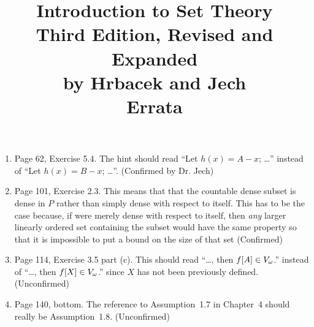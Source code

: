 \documentclass{report}
\title{
  Introduction to Set Theory \\
  Third Edition, Revised and Expanded \\
  by Hrbacek and Jech \\
  Errata
}
\begin{document}


\maketitle

\begin{enumerate}

\item Page 62, Exercise 5.4. The hint should read ``Let $h(x) = A - x$; \ldots'' instead of ``Let $h(x) = B - x$; \ldots''.
  (Confirmed by Dr. Jech)

\item Page 101, Exercise 2.3. This means that that the countable dense subset is dense in $P$ rather than simply dense with respect to itself.
  This has to be the case because, if were merely dense with respect to itself, then \emph{any} larger linearly ordered set containing the subset would have the same property so that it is impossible to put a bound on the size of that set (Confirmed)

\item Page 114, Exercise 3.5 part (c). This should read ``\ldots, then $f[A] \in V_\omega$.'' instead of ``\ldots, then $f[X] \in V_\omega$.'' since $X$ has not been previously defined. (Unconfirmed)

\item Page 140, bottom. The reference to Assumption~1.7 in Chapter~4 should really be Assumption~1.8. (Unconfirmed)

\end{enumerate}
\end{document}
